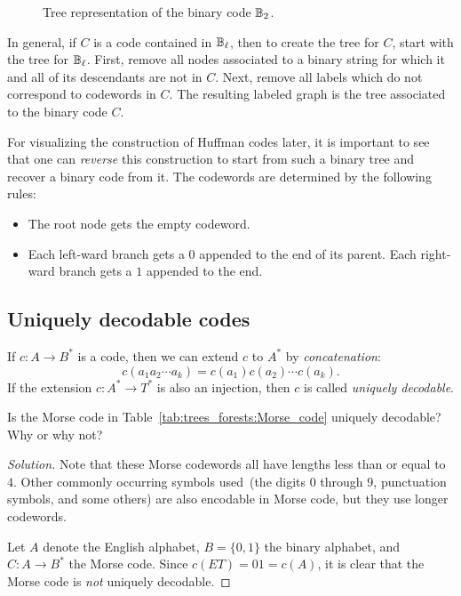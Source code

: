 \begin{figure}[!htbp]
\centering

\caption{Tree representation of the binary code $\mathbb{B}_2$.}
\label{fig:trees_forests:tree_representation_B_2}
\end{figure}

In general, if $C$ is a code contained in $\mathbb{B}_\ell$, then to create
the tree for $C$, start with the tree for $\mathbb{B}_\ell$. First, remove
all nodes associated to a binary string for which it and all of its
descendants are not in $C$. Next, remove all labels which do not
correspond to codewords in $C$. The resulting labeled graph is the
tree associated to the binary code $C$.

For visualizing the construction of Huffman codes later, it is
important to see that one can \emph{reverse} this construction to
start from such a binary tree and recover a binary code from it. The
codewords are determined by the following rules:
%
\begin{itemize}
\item The root node gets the empty codeword.

\item Each left-ward branch gets a $0$ appended to the end of its
  parent. Each right-ward branch gets a $1$ appended to the end.
\end{itemize}



\subsection{Uniquely decodable codes}

If $c: A \to B^*$ is a code, then we can extend $c$ to
$A^*$ by \emph{concatenation}:
\[
c(a_1 a_2 \cdots a_k)
=
c(a_1) c(a_2) \cdots c(a_k).
\]
If the extension $c: A^* \to T^*$ is also an injection,
then $c$ is called \emph{uniquely decodable}.

\begin{example}
Is the Morse code in
Table~\ref{tab:trees_forests:Morse_code} uniquely decodable? Why or
why not?
\end{example}

\begin{proof}[Solution]
Note that these Morse codewords all have lengths less than or equal to
$4$. Other commonly occurring symbols used~(the digits $0$ through
$9$, punctuation symbols, and some others) are also encodable in Morse
code, but they use longer codewords.

Let $A$ denote the English alphabet, $B = \{0, 1\}$ the binary
alphabet, and $C: A \to B^*$ the Morse code. Since
$c(ET) = 01 = c(A)$, it is clear that the Morse code is \emph{not}
uniquely decodable.
\end{proof}

